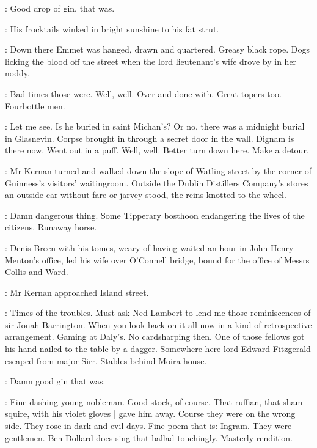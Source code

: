 :
Good drop of gin, that was.

:
His frocktails winked in bright sunshine to his fat strut.

:
Down there Emmet was hanged, drawn and quartered.
Greasy black rope.
Dogs licking the blood off the street
when the lord lieutenant's wife drove by in her noddy.

:
Bad times those were.
Well, well.
Over and done with.
Great topers too.
Fourbottle men.

:
Let me see.
Is he buried in saint Michan's?
Or no, there was a midnight burial in Glasnevin.
Corpse brought in through a secret door in the wall.
Dignam is there now.
Went out in a puff.
Well, well.
Better turn down here.
Make a detour.

:
Mr Kernan turned and walked down the slope of Watling street
by the corner of Guinness's visitors' waitingroom.
Outside the Dublin Distillers Company's stores
an outside car without fare or jarvey stood,
the reins knotted to the wheel.

:
Damn dangerous thing.
Some Tipperary bosthoon
endangering the lives of the citizens.
Runaway horse.

\begin{mdframed}
    :
    Denis Breen with his tomes,
    weary of having waited an hour in John Henry Menton's office,
    led his wife over O'Connell bridge,
    bound for the office
    of Messrs Collis and Ward.
\end{mdframed}

:
Mr Kernan approached Island street.

:
Times of the troubles.
Must ask Ned Lambert to lend me
those reminiscences of sir Jonah Barrington.
When you look back on it all now
in a kind of retrospective arrangement.
Gaming at Daly's.
No cardsharping then.
One of those fellows got his hand nailed to the table by a dagger.
Somewhere here lord Edward Fitzgerald escaped from major Sirr.
Stables behind Moira house.

:
Damn good gin that was.

:
Fine dashing young nobleman.
Good stock, of course.
That ruffian, that sham squire, with his violet gloves |
gave him away.
Course they were on the wrong side.
They rose in dark and evil days.
Fine poem that is:
Ingram.
They were gentlemen.
Ben Dollard does sing that ballad touchingly.
Masterly rendition.

